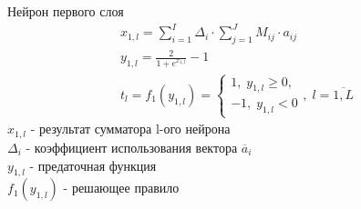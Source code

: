 \begin{frame}{Нейрон первого слоя}
    \begin{gather*}
        x_{1,l} = \sum_{i=1}^{I} \Delta_i \cdot \sum_{j=1}^{J}M_{ij}\cdot a_{ij} \\
        y_{1,l} = \frac{2}{1 + e^{x_{1,l}}} - 1 \\
        t_l = f_1(y_{1,l}) = 
        \begin{cases}   
            1,\; y_{1,l} \geq 0,\\
            -1,\; y_{1,l} < 0
        \end{cases}
        ,\; l = \overline{1,L}
    \end{gather*}
    $x_{1,l}$ - результат сумматора l-ого нейрона \\
    $\Delta_i$ - коэффициент использования вектора $\overline{a}_i$ \\
    $y_{1,l}$ - предаточная функция \\
    $f_1(y_{1,l})$ - решающее правило
\end{frame}
